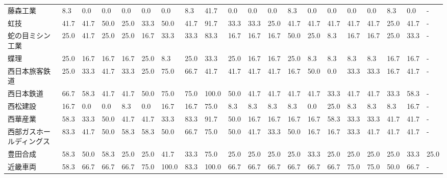 \documentclass[a4paper，11pt]{jsarticle}
\begin{document}
\begin{longtable}[c]{lp{3mm}p{3mm}p{3mm}p{3mm}p{3mm}p{3mm}p{3mm}p{3mm}p{3mm}p{3mm}p{3mm}p{3mm}p{3mm}p{3mm}p{3mm}p{3mm}p{3mm}p{3mm}p{3mm}}
藤森工業            &    8.3 &    0.0 &       0.0 &       0.0 &        0.0 &    0.0 &    8.3 &   41.7 &     0.0 &     0.0 &    0.0 &   8.3 &    0.0 &     0.0 &     0.0 &   0.0 &   8.3 &   0.0 &     - \\
虹技              &   41.7 &   41.7 &      50.0 &      25.0 &       33.3 &   50.0 &   41.7 &   91.7 &    33.3 &    33.3 &   25.0 &  41.7 &   41.7 &    41.7 &    41.7 &  41.7 &  25.0 &  41.7 &     - \\
蛇の目ミシン工業        &   25.0 &   41.7 &      25.0 &      25.0 &       16.7 &   33.3 &   33.3 &   83.3 &    16.7 &    16.7 &   16.7 &  50.0 &   25.0 &     8.3 &    16.7 &  16.7 &  25.0 &  33.3 &     - \\
蝶理              &   25.0 &   16.7 &      16.7 &      16.7 &       25.0 &    8.3 &   25.0 &   33.3 &    25.0 &    16.7 &   16.7 &  25.0 &    8.3 &     8.3 &     8.3 &   8.3 &  16.7 &  16.7 &     - \\
西日本旅客鉄道         &   25.0 &   33.3 &      41.7 &      33.3 &       25.0 &   75.0 &   66.7 &   41.7 &    41.7 &    41.7 &   41.7 &  16.7 &   50.0 &     0.0 &    33.3 &  33.3 &  16.7 &  41.7 &     - \\
西日本鉄道           &   66.7 &   58.3 &      41.7 &      41.7 &       50.0 &   75.0 &   75.0 &  100.0 &    50.0 &    41.7 &   41.7 &  41.7 &   41.7 &    33.3 &    41.7 &  41.7 &  33.3 &  58.3 &     - \\
西松建設            &   16.7 &    0.0 &       0.0 &       8.3 &        0.0 &   16.7 &   16.7 &   75.0 &     8.3 &     8.3 &    8.3 &   8.3 &    0.0 &    25.0 &     8.3 &   8.3 &   8.3 &  16.7 &     - \\
西華産業            &   58.3 &   33.3 &      50.0 &      41.7 &       41.7 &   33.3 &   83.3 &   91.7 &    50.0 &    16.7 &   16.7 &  16.7 &   16.7 &    58.3 &    33.3 &  33.3 &  41.7 &  41.7 &     - \\
西部ガスホールディングス    &   83.3 &   41.7 &      50.0 &      58.3 &       58.3 &   50.0 &   66.7 &   75.0 &    50.0 &    41.7 &   33.3 &  50.0 &   16.7 &    16.7 &    33.3 &  41.7 &  41.7 &  41.7 &     - \\
豊田合成            &   58.3 &   50.0 &      58.3 &      25.0 &       25.0 &   41.7 &   33.3 &   75.0 &    25.0 &    25.0 &   25.0 &  25.0 &   33.3 &    25.0 &    25.0 &  25.0 &  25.0 &  33.3 &  25.0 \\
近畿車両            &   58.3 &   66.7 &      66.7 &      66.7 &       75.0 &  100.0 &   83.3 &  100.0 &    66.7 &    66.7 &   66.7 &  66.7 &   66.7 &    66.7 &    75.0 &  75.0 &  50.0 &  66.7 &     - \\

\end{longtable}
\end{document}
